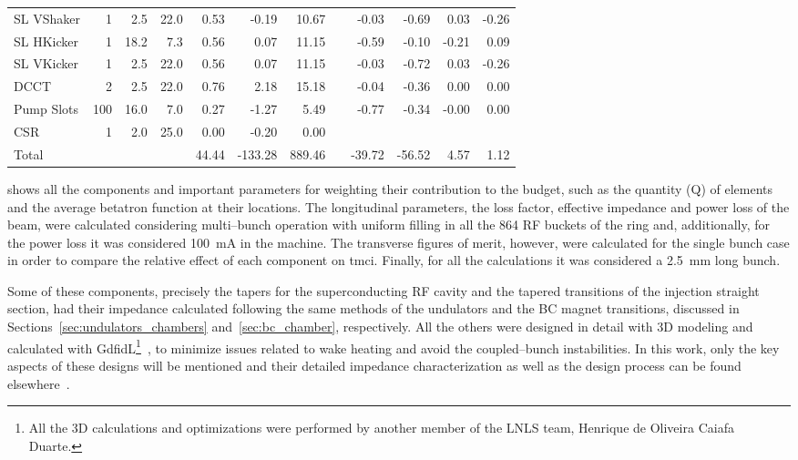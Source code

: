 \begin{sidewaystable}
{\begin{tabular}{l d{0} d{-1} d{-1} d{-1} d{-1} d{-1} c d{-1} d{-1} d{-1} d{-1}}
            SL VShaker     &  1   &  2.5   &  22.0   &   0.53 &   -0.19 &   10.67 & &   -0.03 &   -0.69 &   0.03 &  -0.26 \\
            SL HKicker     &  1   &  18.2  &  7.3    &   0.56 &    0.07 &   11.15 & &   -0.59 &   -0.10 &  -0.21 &   0.09 \\
            SL VKicker     &  1   &  2.5   &  22.0   &   0.56 &    0.07 &   11.15 & &   -0.03 &   -0.72 &   0.03 &  -0.26 \\
            DCCT           &  2   &  2.5   &  22.0   &   0.76 &    2.18 &   15.18 & &   -0.04 &   -0.36 &   0.00 &   0.00 \\
            Pump Slots     & 100  &  16.0  &  7.0    &   0.27 &   -1.27 &    5.49 & &   -0.77 &   -0.34 &  -0.00 &   0.00 \\
            CSR            &  1   &  2.0   &  25.0   &   0.00 &   -0.20 &    0.00 & &         &         &        &        \\
            \midrule
            Total	       &      &        &         &  44.44 & -133.28 &  889.46 & &  -39.72 &  -56.52 &   4.57 &   1.12 \\
            \bottomrule
        \end{tabular}}
    \end{sidewaystable}
    shows all the components and important parameters for weighting their contribution to the budget, such as the quantity (Q) of elements and the average betatron function at their locations. The longitudinal parameters, the loss factor, effective impedance and power loss of the beam, were calculated considering multi--bunch operation with uniform filling in all the \num{864} RF buckets of the ring and, additionally, for the power loss it was considered \SI{100}{\milli\ampere} in the machine. The transverse figures of merit, however, were calculated for the single bunch case in order to compare the relative effect of each component on \gls{tmci}. Finally, for all the calculations it was considered a \SI{2.5}{\milli\meter} long bunch.

    Some of these components, precisely the tapers for the superconducting RF cavity and the tapered transitions of the injection straight section, had their impedance calculated following the same methods of the undulators and the BC magnet transitions, discussed in Sections~\ref{sec:undulators_chambers} and~\ref{sec:bc_chamber}, respectively. All the others were designed in detail with 3D modeling and calculated with GdfidL\footnote{All the 3D calculations and optimizations were performed by another member of the LNLS team, Henrique de Oliveira Caiafa Duarte.}~\cite{Bruns1997}, to minimize issues related to wake heating and avoid the  coupled--bunch instabilities. In this work, only the key aspects of these designs will be mentioned and their detailed impedance characterization as well as the design process can be found elsewhere~\cite{Duarte2013,Duarte2017,Duarte2017a}.

